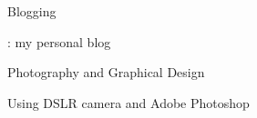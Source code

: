 \begin{cvprojects}
  \cvproject
    {Blogging} %
    {} %
    {} %
    {} %
    {\begin{cvitems}
    \item{: my personal blog}
    \end{cvitems}}

  \cvproject
    {Photography and Graphical Design} %
    {} %
    {} %
    {} %
    {\begin{cvitems}\item{Using DSLR camera and Adobe Photoshop}\end{cvitems}}

\end{cvprojects}


